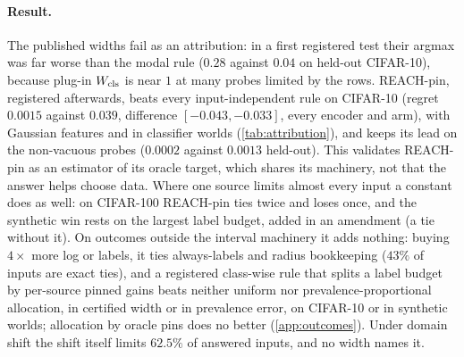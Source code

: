 \paragraph{Result.} The published widths fail as an attribution: in a first registered test their argmax
was far worse than the modal rule ($0.28$ against $0.04$ on held-out CIFAR-10), because plug-in $W_{\mathrm{cls}}$ is
near $1$ at many probes limited by the rows. REACH-pin, registered afterwards, beats every input-independent
rule on CIFAR-10 (regret $0.0015$ against $0.039$, difference $[-0.043,-0.033]$, every encoder and arm), with Gaussian features and in classifier worlds (\cref{tab:attribution}), and keeps
its lead on the non-vacuous probes ($0.0002$ against $0.0013$ held-out). This validates REACH-pin as an
estimator of its oracle target, which shares its machinery, not that the answer helps choose data. Where one source limits almost every input a constant does as well: on
CIFAR-100 REACH-pin ties twice and loses once, and the synthetic win rests on the largest label budget,
added in an amendment (a tie without it). On outcomes outside the interval machinery it adds nothing:
buying $4\times$ more log or labels, it ties always-labels and radius bookkeeping ($43\%$ of inputs are exact
ties), and a registered class-wise rule that splits a label budget by per-source pinned gains beats neither
uniform nor prevalence-proportional allocation, in certified width or in prevalence error, on CIFAR-10 or in
synthetic worlds; allocation by oracle pins does no better (\cref{app:outcomes}). Under domain shift the
shift itself limits $62.5\%$ of answered inputs, and no width names it.
